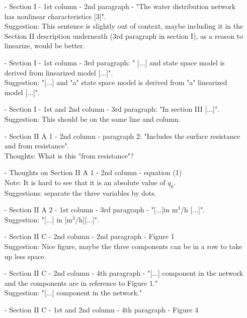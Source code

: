 \begin{itemize}
\item[-]Section I - 1st column - 2nd paragraph - "The water distribution network has nonlinear characteristics [3]".\\
Suggestion: This sentence is slightly out of context, maybe including it in the Section II description underneath (3rd paragraph in section I), as a reason to linearize, would be better.\\
\item[-]Section I - 1st column - 3rd paragraph: " [...] and state space model is derived from linearized model [...]".\\
Suggestion: "[...] and "a" state space model is derived from "a" linearized model [...]".\\
\item[-]Section I - 1st and 2nd column - 3rd paragraph: "In section III [...]".\\
Suggestion: This should be on the same line and column.\\
\item[-]Section II A 1 - 2nd column - paragraph 2: "Includes the surface resistance and from resistance".\\
Thoughts: What is this "from resistance"?\\
\item[-]Thoughts on Section II A 1 - 2nd column - equation (1)\\
Note: It is hard to see that it is an absolute value of $q_k$. \\
Suggestions: separate the three variables by dots.\\
\item[-]Section II A 2 - 1st column - 3rd paragraph - "[...]in m$^3$/h [...]".\\
Suggestion: "[...] in [m$^3$/h][...]".\\
\item[-]Section II C - 2nd column - 2nd paragraph - Figure 1\\
Suggestion: Nice figure, maybe the three components can be in a row to take up less space.\\
\item[-]Section II C - 2nd column - 4th paragraph - "[...] component in the network and the components are in reference to Figure 1."\\
Suggestion: "[...] component in the network."\\
\item[-]Section II C - 1st and 2nd column - 4th paragraph - Figure 4\\

\end{itemize}
